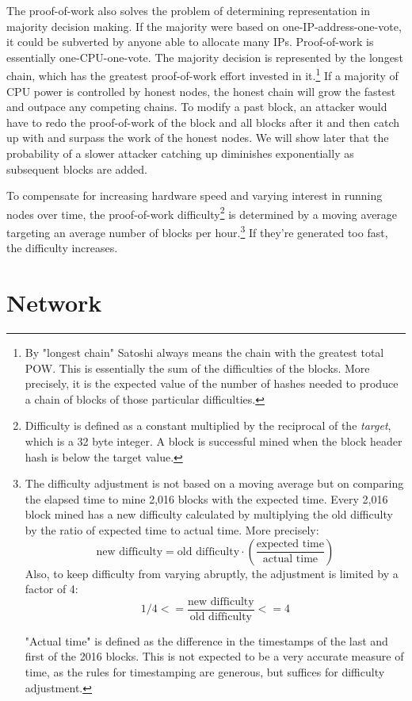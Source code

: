 \documentclass[nohyper]{tufte-handout}
\begin{document}
The proof-of-work also solves the problem of determining representation
in majority decision making. If the majority were based on
one-IP-address-one-vote, it could be subverted by anyone able to
allocate many IPs. Proof-of-work is essentially one-CPU-one-vote. The
majority decision is represented by the longest chain, which has the greatest proof-of-work effort invested in it.\footnote{By "longest chain" Satoshi always means the chain with the greatest total POW.  This is essentially the sum of the difficulties of the blocks.  More precisely, it is the expected value of the number of hashes needed to produce a chain of blocks of those particular difficulties.} If a majority of CPU power is controlled by honest nodes, the honest chain will grow the fastest and outpace any competing chains. To modify a past block, an attacker would have to redo the proof-of-work of the block and all blocks after
it and then catch up with and surpass the work of the honest nodes. We will show later that the probability of a slower attacker catching up
diminishes exponentially as subsequent blocks are added.


To compensate for increasing hardware speed and varying interest in running nodes over time, the proof-of-work difficulty\footnote{Difficulty is defined as a constant multiplied by the reciprocal of the \emph{target}, which is a 32 byte integer.  A block is successful mined when the block header hash is below the target value.
} is determined by a moving average targeting an average number of blocks per hour.\footnote{The difficulty adjustment is not based on a moving average but on comparing the elapsed time to mine 2,016 blocks with the expected time.  Every 2,016 block mined has a new difficulty calculated by multiplying the old difficulty by the ratio of expected time to actual time.  More precisely: $$ \text{new difficulty} = \text{old difficulty} \cdot \left( \frac{\text{expected time}}{\text{actual time}}\right)$$ Also, to keep difficulty from varying abruptly, the adjustment is limited by a factor of 4: $$1/4 <= \frac{\text{new difficulty}}{\text{old difficulty}} <= 4$$

"Actual time" is defined as the difference in the timestamps of the last and first of the 2016 blocks.  This is not expected to be a very accurate measure of time, as the rules for timestamping are generous, but suffices for difficulty adjustment.
 }   If they're generated too fast, the difficulty increases.

\section{Network}\label{network}
\end{document}
